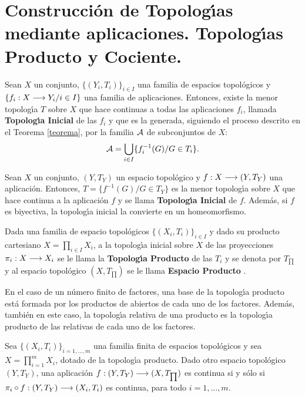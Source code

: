 \documentclass[cursovd_portada.tex]{subfiles}
\begin{document}
\section{Construcci\'{o}n de Topolog\'{\i}as mediante aplicaciones. Topolog\'{\i}as Producto y Cociente.}
\begin{prop}
Sean $X$ un conjunto, $\{(Y_i,T_i)\}_{i\in I}$ una familia de espacios topol\'{o}gicos y $\{f_i:X\longrightarrow Y_i/i\in I\}$ una
familia de aplicaciones. Entonces, existe la menor topolog\'{\i}a $T$ sobre $X$ que hace continuas a todas las
aplicaciones $f_i$, llamada {\bf Topolog\'{\i}a Inicial} de las $f_i$ y que es la generada, siguiendo el proceso
descrito en el Teorema \ref{teorema}, por la familia ${\cal A}$ de subconjuntos de $X$:
$${\cal A}=\bigcup_{i\in I}\{f_i^{-1}(G)/G\in T_i\}.$$
\end{prop}
\begin{coro}
Sean $X$ un conjunto, $(Y,T_Y)$ un espacio topol\'{o}gico y $f:X\longrightarrow (Y,T_Y)$ una aplicaci\'{o}n. Entonces,
$T=\{f^{-1}(G)/G\in T_Y\}$ es la menor topolog\'{\i}a sobre $X$ que hace continua a la aplicaci\'{o}n $f$ y se llama {\bf
Topolog\'{\i}a Inicial} de $f$. Adem\'{a}s, si $f$ es biyectiva, la topolog\'{\i}a inicial la convierte en un homeomorfismo.
\end{coro}
\begin{defi}
Dada una familia de espacio topol\'{o}gicos $\{(X_i,T_i)\}_{i\in I}$ y dado su producto cartesiano $X=\prod_{i\in
I}X_i$, a la topolog\'{\i}a inicial sobre $X$ de las proyecciones $\pi_i:X\longrightarrow X_i$ se le llama la {\bf Topolog\'{\i}a
Producto} de las $T_i$ y se denota por $T_{\prod}$ y al espacio topol\'{o}gico $(X,T_{\prod})$ se le llama {\bf
Espacio Producto} .
\end{defi}
\begin{nota}
{\rm En el caso de un n\'{u}mero finito de factores, una base de la topolog\'{\i}a producto est\'{a} formada por los productos
de abiertos de cada uno de los factores. Adem\'{a}s, tambi\'{e}n en este caso, la topolog\'{\i}a relativa de una producto es la
topolog\'{\i}a producto de las relativas de cada uno de los factores.}
\end{nota}
\begin{prop}
Sea $\{(X_i,T_i)\}_{i=1,\dots ,m}$ una familia finita de espacios to\-po\-l\'{o}\-gi\-cos y sea $X=\prod_{i=1}^mX_i$,
dotado de la topolog\'{\i}a producto. Dado otro espacio topol\'{o}gico $(Y,T_Y)$, una aplicaci\'{o}n $f:(Y,T_Y)\longrightarrow
(X,T_{\prod})$ es continua si y s\'{o}lo si $\pi_i\circ f:(Y,T_Y)\longrightarrow (X_i,T_i)$ es continua, para todo $i=1,\dots ,m$.
\end{prop}
\end{document}
